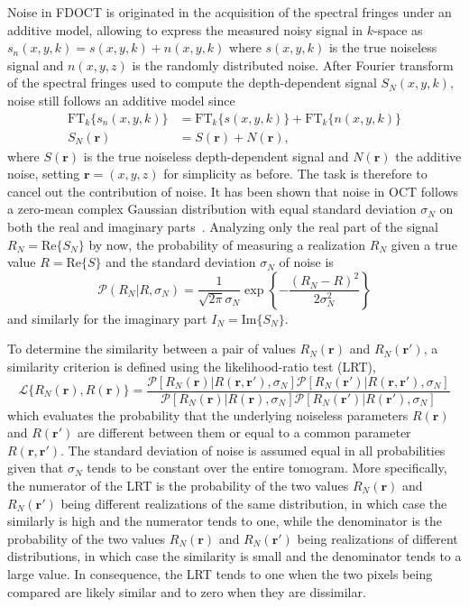 Noise in FDOCT is originated in the acquisition of the spectral fringes under an additive model, allowing to express the measured noisy signal in $k$-space as $s_n(x,y,k) = s(x,y,k) + n(x,y,k)$ where $s(x,y,k)$ is the true noiseless signal and $n(x,y,z)$ is the randomly distributed noise. After Fourier transform of the spectral fringes used to compute the depth-dependent signal $S_N(x,y,k)$, noise still follows an additive model since
\begin{align}
    \text{FT}_k\{s_n(x,y,k)\} &= \text{FT}_k\{s(x,y,k)\} + \text{FT}_k\{n(x,y,k)\} \nonumber\\
    S_N(\mathbf{r}) &= S(\mathbf{r}) + N(\mathbf{r}),
\end{align}
where $S(\mathbf{r})$ is the true noiseless depth-dependent signal and $N(\mathbf{r})$ the additive noise, setting $\mathbf{r} = (x,y,z)$ for simplicity as before. The task is therefore to cancel out the contribution of noise. It has been shown that noise in OCT follows a zero-mean complex Gaussian distribution with equal standard deviation $\sigma_N$ on both the real and imaginary parts~\cite{Makita2016_Noiseimmune, Uribe-Patarroyo2020_Noise}. Analyzing only the real part of the signal $R_N = \text{Re}\{S_N\}$ by now, the probability of measuring a realization $R_N$ given a true value $R = \text{Re}\{S\}$ and the standard deviation $\sigma_N$ of noise is~\cite{Deledalle2012_How}
\begin{equation}\label{eq:GaussianProb}
    \mathcal{P}(R_N|R, \sigma_N) = \frac{1}{\sqrt{2\pi}\sigma_N} \exp\left\{-\frac{(R_N-R) ^ 2} {2\sigma_N^2}\right\}
\end{equation}
and similarly for the imaginary part $I_N = \text{Im}\{S_N\}$.

To determine the similarity between a pair of values $R_N(\bm{r})$ and $R_N(\bm{r}')$, a similarity criterion is defined using the likelihood-ratio test (LRT),
\begin{equation}
    \mathcal{L}\{R_N(\bm{r}), R(\bm{r})\} = \frac{\mathcal{P}[R_N(\bm{r})|R(\bm{r},\bm{r}'), \sigma_N] \mathcal{P}[R_N(\bm{r}')|R(\bm{r},\bm{r}'), \sigma_N]} {\mathcal{P}[R_N(\bm{r})|R(\bm{r}), \sigma_N] \mathcal{P}[R_N(\bm{r}')|R(\bm{r}'), \sigma_N]}
\end{equation}
which evaluates the probability that the underlying noiseless parameters $R(\bm{r})$ and $R(\bm{r}')$ are different between them or equal to a common parameter $R(\bm{r}, \bm{r}')$. The standard deviation of noise is assumed equal in all probabilities given that $\sigma_N$ tends to be constant over the entire tomogram. More specifically, the numerator of the LRT is the probability of the two values $R_N(\bm{r})$ and $R_N(\bm{r}')$ being different realizations of the same distribution, in which case the similarly is high and the numerator tends to one, while the denominator is the probability of the two values $R_N(\bm{r})$ and $R_N(\bm{r}')$ being realizations of different distributions, in which case the similarity is small and the denominator tends to a large value. In consequence, the LRT tends to one when the two pixels being compared are likely similar and to zero when they are dissimilar.

